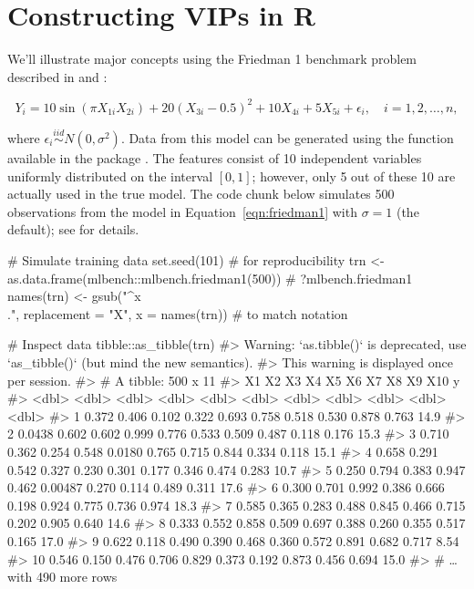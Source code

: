 \section{Constructing VIPs in R}

We'll illustrate major concepts using the Friedman 1 benchmark problem described in \citet{multivariate-friedman-1991} and \citet{bagging-breiman-1996}: 

\begin{equation}
  Y_i = 10 \sin\left(\pi X_{1i} X_{2i}\right) + 20 \left(X_{3i} - 0.5\right) ^ 2 + 10 X_{4i} + 5 X_{5i} + \epsilon_i, \quad i = 1, 2, \dots, n,
\label{eqn:friedman1}
\end{equation}

where $\epsilon_i \stackrel{iid}{\sim} N\left(0, \sigma^2\right)$. Data from this model can be generated using the  function available in the  package \citep{mlbench-pkg}. The features consist of 10 independent variables uniformly distributed on the interval $\left[0,1\right]$; however, only 5 out of these 10 are actually used in the true model. The code chunk below simulates 500 observations from the model in Equation~\eqref{eqn:friedman1} with $\sigma = 1$ (the default); see  for details.

\begin{example}
# Simulate training data
set.seed(101)  # for reproducibility
trn <- as.data.frame(mlbench::mlbench.friedman1(500))  # ?mlbench.friedman1
names(trn) <- gsub("^x\\.", replacement = "X", x = names(trn))  # to match notation

# Inspect data
tibble::as_tibble(trn)
#> Warning: `as.tibble()` is deprecated, use `as_tibble()` (but mind the new semantics).
#> This warning is displayed once per session.
#> # A tibble: 500 x 11
#>        X1    X2    X3    X4     X5      X6    X7    X8    X9   X10     y
#>     <dbl> <dbl> <dbl> <dbl>  <dbl>   <dbl> <dbl> <dbl> <dbl> <dbl> <dbl>
#>  1 0.372  0.406 0.102 0.322 0.693  0.758   0.518 0.530 0.878 0.763 14.9 
#>  2 0.0438 0.602 0.602 0.999 0.776  0.533   0.509 0.487 0.118 0.176 15.3 
#>  3 0.710  0.362 0.254 0.548 0.0180 0.765   0.715 0.844 0.334 0.118 15.1 
#>  4 0.658  0.291 0.542 0.327 0.230  0.301   0.177 0.346 0.474 0.283 10.7 
#>  5 0.250  0.794 0.383 0.947 0.462  0.00487 0.270 0.114 0.489 0.311 17.6 
#>  6 0.300  0.701 0.992 0.386 0.666  0.198   0.924 0.775 0.736 0.974 18.3 
#>  7 0.585  0.365 0.283 0.488 0.845  0.466   0.715 0.202 0.905 0.640 14.6 
#>  8 0.333  0.552 0.858 0.509 0.697  0.388   0.260 0.355 0.517 0.165 17.0 
#>  9 0.622  0.118 0.490 0.390 0.468  0.360   0.572 0.891 0.682 0.717  8.54
#> 10 0.546  0.150 0.476 0.706 0.829  0.373   0.192 0.873 0.456 0.694 15.0 
#> # … with 490 more rows
\end{example}

